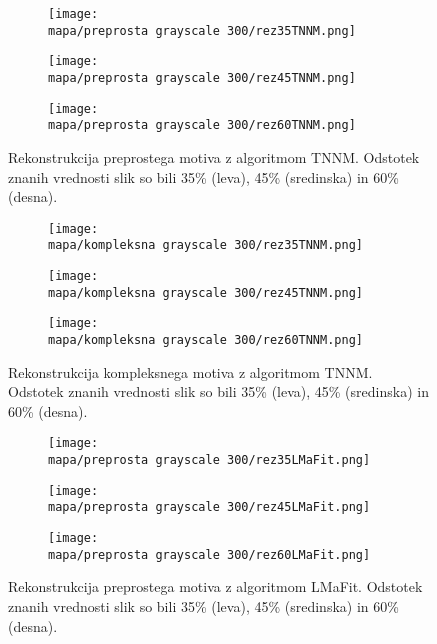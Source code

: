 \begin{figure}[!ht]
    \begin{subfigure}{0.325\linewidth}
        \texttt{[image: \\mapa/preprosta grayscale 300/rez35TNNM.png]}
    \end{subfigure}
    \hfill
    \begin{subfigure}{0.325\linewidth}
        \texttt{[image: \\mapa/preprosta grayscale 300/rez45TNNM.png]}
    \end{subfigure}
    \hfill
    \begin{subfigure}{0.325\linewidth}
        \texttt{[image: \\mapa/preprosta grayscale 300/rez60TNNM.png]}
    \end{subfigure}
    \caption{Rekonstrukcija preprostega motiva z algoritmom TNNM. Odstotek znanih vrednosti slik so bili 35\% (leva), 45\% (sredinska) in 60\% (desna).}
\end{figure}

\begin{figure}[!ht]
    \begin{subfigure}{0.325\linewidth}
        \texttt{[image: \\mapa/kompleksna grayscale 300/rez35TNNM.png]}
    \end{subfigure}
    \hfill
    \begin{subfigure}{0.325\linewidth}
        \texttt{[image: \\mapa/kompleksna grayscale 300/rez45TNNM.png]}
    \end{subfigure}
    \hfill
    \begin{subfigure}{0.325\linewidth}
        \texttt{[image: \\mapa/kompleksna grayscale 300/rez60TNNM.png]}
    \end{subfigure}
    \caption{Rekonstrukcija kompleksnega motiva z algoritmom TNNM. Odstotek znanih vrednosti slik so bili 35\% (leva), 45\% (sredinska) in 60\% (desna).}
\end{figure}

\begin{figure}[!ht]
    \begin{subfigure}{0.325\linewidth}
        \texttt{[image: \\mapa/preprosta grayscale 300/rez35LMaFit.png]}
    \end{subfigure}
    \hfill
    \begin{subfigure}{0.325\linewidth}
        \texttt{[image: \\mapa/preprosta grayscale 300/rez45LMaFit.png]}
    \end{subfigure}
    \hfill
    \begin{subfigure}{0.325\linewidth}
        \texttt{[image: \\mapa/preprosta grayscale 300/rez60LMaFit.png]}
    \end{subfigure}
    \caption{Rekonstrukcija preprostega motiva z algoritmom LMaFit. Odstotek znanih vrednosti slik so bili 35\% (leva), 45\% (sredinska) in 60\% (desna).}
\end{figure}

